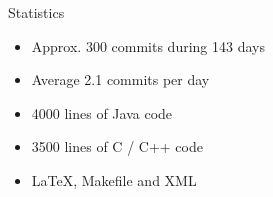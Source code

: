 
\begin{frame}{Statistics}
	\begin{itemize}
		\pause
		\item Approx. 300 commits during 143 days
		\pause
		\item Average 2.1 commits per day
		\pause
		\item 4000 lines of Java code
		\pause
		\item 3500 lines of C / C++ code
		\pause
		\item LaTeX, Makefile and XML
	\end{itemize}
\end{frame}